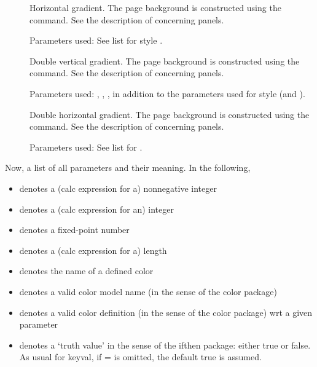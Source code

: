 \documentclass[12pt]{scrartcl}
\begin{document}
\begin{description}
  \item[]
    Horizontal gradient. The page background is constructed using the
     command.  See the description of
     concerning panels.

    Parameters used: See list for style .

  \item[]
    Double vertical gradient. The page background is constructed using the
     command. See the
    description of  concerning panels.

    \begin{flushleft}
    Parameters used: , ,
    ,  in addition to the parameters used for
    style  (and ).
    \end{flushleft}

  \item[]
    Double horizontal gradient. The page background is constructed using the
     command. See the description of
     concerning panels.

    Parameters used: See list for .

  \end{description}
  Now, a list of all parameters and their meaning. In the following,
  \begin{itemize}\setlength{\itemsep}{0cm}
  \item[\carg{n}]   denotes a (calc expression for a) nonnegative integer
  \item[\carg{i}]   denotes a (calc expression for an) integer
  \item[\carg{r}]   denotes a fixed-point number
  \item[\carg{l}]   denotes a (calc expression for a) length
  \item[\carg{c}]   denotes the name of a defined color
  \item[\carg{cm}]  denotes a valid color model name (in the sense of the color
    package)
  \item[\carg{cd}]  denotes a valid color definition (in the sense of the color
    package) wrt a given  parameter
  \item[\carg{t}]   denotes a `truth value' in the sense of the ifthen package:
    either true or false. As usual for keyval, if = is omitted, the
    default true is assumed.
  \end{itemize}
\end{document}
